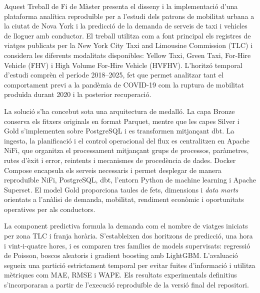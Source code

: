 Aquest Treball de Fi de Màster presenta el disseny i la implementació d'una plataforma analítica reproduïble per a l'estudi dels patrons de mobilitat urbana a la ciutat de Nova York i la predicció de la demanda de serveis de taxi i vehicles de lloguer amb conductor. El treball utilitza com a font principal els registres de viatges publicats per la New York City Taxi and Limousine Commission (TLC) i considera les diferents modalitats disponibles: Yellow Taxi, Green Taxi, For-Hire Vehicle (FHV) i High Volume For-Hire Vehicle (HVFHV). L'horitzó temporal d'estudi comprèn el període 2018--2025, fet que permet analitzar tant el comportament previ a la pandèmia de COVID-19 com la ruptura de mobilitat produïda durant 2020 i la posterior recuperació.

La solució s'ha concebut sota una arquitectura de medalló. La capa Bronze conserva els fitxers originals en format Parquet, mentre que les capes Silver i Gold s'implementen sobre PostgreSQL i es transformen mitjançant dbt. La ingesta, la planificació i el control operacional del flux es centralitzen en Apache NiFi, que organitza el processament mitjançant grups de processos, paràmetres, rutes d'èxit i error, reintents i mecanismes de procedència de dades. Docker Compose encapsula els serveis necessaris i permet desplegar de manera reproduïble NiFi, PostgreSQL, dbt, l'entorn Python de machine learning i Apache Superset. El model Gold proporciona taules de fets, dimensions i \textit{data marts} orientats a l'anàlisi de demanda, mobilitat, rendiment econòmic i oportunitats operatives per als conductors.

La component predictiva formula la demanda com el nombre de viatges iniciats per zona TLC i franja horària. S'estableixen dos horitzons de predicció, una hora i vint-i-quatre hores, i es comparen tres famílies de models supervisats: regressió de Poisson, boscos aleatoris i gradient boosting amb LightGBM\@. L'avaluació segueix una partició estrictament temporal per evitar fuites d'informació i utilitza mètriques com MAE, RMSE i WAPE\@. Els resultats experimentals definitius s'incorporaran a partir de l'execució reproduïble de la versió final del repositori.
